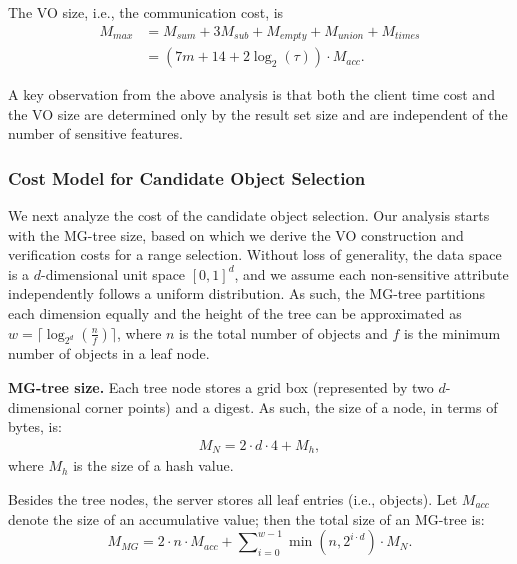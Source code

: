 The VO size, i.e., the communication cost, is
\begin{align*}
  M_{max} &= M_{sum} + 3 M_{sub} + M_{empty} + M_{union} + M_{times}\nonumber  \\ %
          & =  (7m + 14 + 2 \log_2 (\tau)) \cdot M_{acc}.
\end{align*}

A key observation from the above analysis is that both the client time cost and the VO size are determined only by the result set size and are independent of the number of sensitive features.

\subsubsection{Cost Model for Candidate Object Selection}
We next analyze the cost of the candidate object selection. Our analysis starts with the MG-tree size, based on which we derive the VO construction and verification costs for a range selection. Without loss of generality, the data space is a $d$-dimensional unit space ${[0,1]}^d$, and we assume each non-sensitive attribute independently follows a uniform distribution. As such, the MG-tree partitions each dimension equally and the height of the tree can be approximated as $w=\lceil \log_{2^d}(\frac{n}{f})\rceil$, where $n$ is the total number of objects and $f$ is the minimum number of objects in a leaf node.

\textbf{MG-tree size.} Each tree node stores a grid box (represented by two $d$-dimensional corner points) and a digest. As such, the size of a node, in terms of bytes, is:
\begin{align*}
  M_{N} = 2 \cdot d \cdot 4 + M_h,
\end{align*}
where $M_h$ is the size of a hash value.

Besides the tree nodes, the server stores all leaf entries (i.e., objects). Let $M_{acc}$ denote the size of an accumulative value; then the total size of an MG-tree is:
\begin{equation*}
  M_{MG} = 2 \cdot n \cdot M_{acc} +  \sum\nolimits_{i=0}^{w-1} \min(n, 2^{i \cdot d}) \cdot M_{N}.
\end{equation*}

